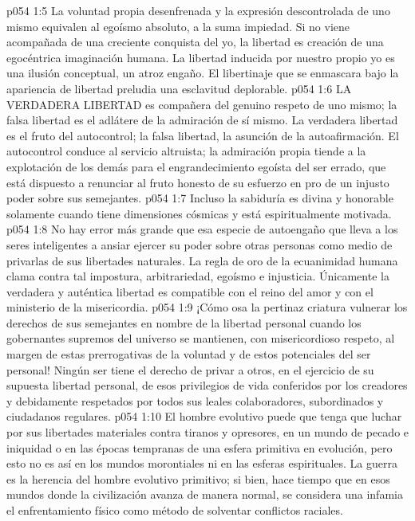 \vs p054 1:5 La voluntad propia desenfrenada y la expresión descontrolada de uno mismo equivalen al egoísmo absoluto, a la suma impiedad. Si no viene acompañada de una creciente conquista del yo, la libertad es creación de una egocéntrica imaginación humana. La libertad inducida por nuestro propio yo es una ilusión conceptual, un atroz engaño. El libertinaje que se enmascara bajo la apariencia de libertad preludia una esclavitud deplorable.
\vs p054 1:6 LA VERDADERA LIBERTAD es compañera del genuino respeto de uno mismo; la falsa libertad es el adlátere de la admiración de sí mismo. La verdadera libertad es el fruto del autocontrol; la falsa libertad, la asunción de la autoafirmación. El autocontrol conduce al servicio altruista; la admiración propia tiende a la explotación de los demás para el engrandecimiento egoísta del ser errado, que está dispuesto a renunciar al fruto honesto de su esfuerzo en pro de un injusto poder sobre sus semejantes.
\vs p054 1:7 \pc Incluso la sabiduría es divina y honorable solamente cuando tiene dimensiones cósmicas y está espiritualmente motivada.
\vs p054 1:8 \pc No hay error más grande que esa especie de autoengaño que lleva a los seres inteligentes a ansiar ejercer su poder sobre otras personas como medio de privarlas de sus libertades naturales. La regla de oro de la ecuanimidad humana clama contra tal impostura, arbitrariedad, egoísmo e injusticia. Únicamente la verdadera y auténtica libertad es compatible con el reino del amor y con el ministerio de la misericordia.
\vs p054 1:9 ¡Cómo osa la pertinaz criatura vulnerar los derechos de sus semejantes en nombre de la libertad personal cuando los gobernantes supremos del universo se mantienen, con misericordioso respeto, al margen de estas prerrogativas de la voluntad y de estos potenciales del ser personal! Ningún ser tiene el derecho de privar a otros, en el ejercicio de su supuesta libertad personal, de esos privilegios de vida conferidos por los creadores y debidamente respetados por todos sus leales colaboradores, subordinados y ciudadanos regulares.
\vs p054 1:10 El hombre evolutivo puede que tenga que luchar por sus libertades materiales contra tiranos y opresores, en un mundo de pecado e iniquidad o en las épocas tempranas de una esfera primitiva en evolución, pero esto no es así en los mundos morontiales ni en las esferas espirituales. La guerra es la herencia del hombre evolutivo primitivo; si bien, hace tiempo que en esos mundos donde la civilización avanza de manera normal, se considera una infamia el enfrentamiento físico como método de solventar conflictos raciales.

